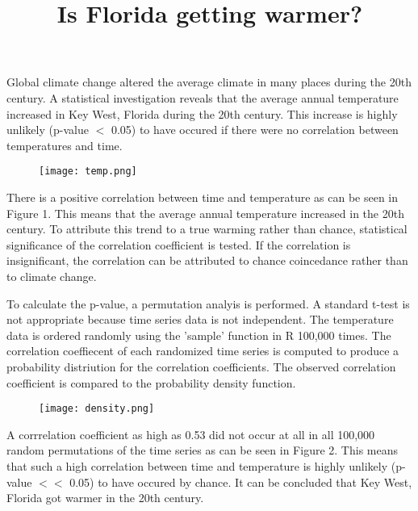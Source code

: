 \documentclass[11pt]{article}
\title{Is Florida getting warmer?}
\date{\vspace{-2cm}}
\begin{document}
  \maketitle
  
Global climate change altered the average climate in many places during the 20th century. 
A statistical investigation reveals that the average annual temperature increased in Key West, 
Florida during the 20th century. 
This increase is highly unlikely (p-value $<$ 0.05) to have occured if 
there were no correlation between temperatures and time.

\begin{figure}[h!]
  \centering
  \texttt{[image: temp.png]}
  \label{fig:temps}
\end{figure}

There is a positive correlation between time and temperature as can be seen in Figure 1.
This means that the average annual temperature increased in the 20th century. 
To attribute this trend to a true warming rather than chance, statistical significance of the 
correlation coefficient is tested. If the correlation is insignificant,
the correlation can be attributed to chance coincedance rather than to climate change.

To calculate the p-value, a permutation analyis is performed.
A standard t-test is not appropriate because time series data is not independent.
The temperature data is ordered randomly using the 'sample' function in R 100,000 times. 
The correlation coeffiecent of each randomized time series is computed to 
produce a probability distriution for the correlation coefficients. 
The observed correlation coefficient is compared to the probability density function.

\begin{figure}[h!]
  \centering
  \texttt{[image: density.png]}
  \label{fig:distribution}
\end{figure}

A corrrelation coefficient as high as 0.53 did not occur at all in all 100,000 random permutations of the 
time series as can be seen in Figure 2. This means that such a high 
correlation between time and temperature is highly unlikely (p-value $<$$<$ 0.05) to have occured by chance. 
It can be concluded that Key West, Florida got warmer in the 20th century.
\end{document}
